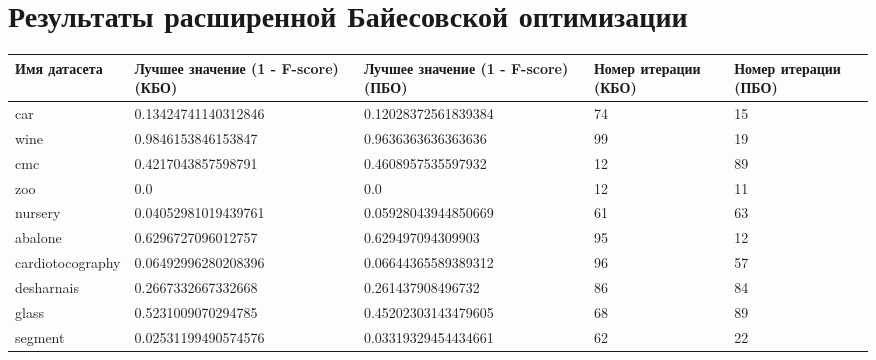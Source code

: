 \documentclass[times,specification,annotation]{itmo-student-thesis}
\begin{document}
	\chapter{Результаты расширенной Байесовской оптимизации}\label{app:pbo-results}
	\begin{center} %
		\begin{longtable}{ |m{3.4cm}|m{4.7cm}|m{4.7cm}|m{1.5cm}|m{1.5cm}| } 
		\hline
		\textbf{Имя датасета} & \textbf{Лучшее значение (1 - F-score) (КБО)} & \textbf{Лучшее значение (1 - F-score) (ПБО)} & \textbf{Номер итерации (КБО)} &  \textbf{Номер итерации (ПБО)} \\
		\hline\hline
		car & 0.13424741140312846 & 0.12028372561839384 & 74 & 15 \\
		\hline
		wine & 0.9846153846153847 & 0.9636363636363636 & 99 & 19 \\
		\hline
		cmc & 0.4217043857598791 & 0.4608957535597932 & 12 & 89 \\
		\hline
		zoo & 0.0 & 0.0 & 12 & 11 \\
		\hline
		nursery & 0.04052981019439761 & 0.05928043944850669 & 61 & 63 \\
		\hline
		abalone & 0.6296727096012757 & 0.629497094309903 & 95 & 12 \\
		\hline
		cardiotocography & 0.06492996280208396 & 0.06644365589389312 & 96 & 57 \\
		\hline
		desharnais & 0.2667332667332668 & 0.261437908496732 & 86 & 84 \\
		\hline
		glass & 0.5231009070294785 & 0.45202303143479605 & 68 & 89 \\
		\hline
		segment & 0.02531199490574576 & 0.03319329454434661 & 62 & 22 \\
		\hline
		
		\end{longtable}
	\end{center}
\end{document}
